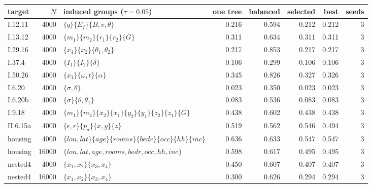 \begin{tabular}{@{}lrlrrrrr@{}}\toprule
target & $N$ & induced groups ($\tau=0.05$) & one tree & balanced & selected & best & seeds\\\midrule
I.12.11 & 4000 & $\{q\} \{E_f\} \{B,v,\theta\}$ & 0.216 & 0.594 & 0.212 & 0.212 & 3\\
I.13.12 & 4000 & $\{m_1\} \{m_2\} \{r_1\} \{r_2\} \{G\}$ & 0.311 & 0.634 & 0.311 & 0.311 & 3\\
I.29.16 & 4000 & $\{x_1\} \{x_2\} \{\theta_1,\theta_2\}$ & 0.217 & 0.853 & 0.217 & 0.217 & 3\\
I.37.4 & 4000 & $\{I_1\} \{I_2\} \{\delta\}$ & 0.106 & 0.299 & 0.106 & 0.106 & 3\\
I.50.26 & 4000 & $\{x_1\} \{\omega,t\} \{\alpha\}$ & 0.345 & 0.826 & 0.327 & 0.326 & 3\\
I.6.20 & 4000 & $\{\sigma,\theta\}$ & 0.023 & 0.350 & 0.023 & 0.023 & 3\\
I.6.20b & 4000 & $\{\sigma\} \{\theta,\theta_1\}$ & 0.083 & 0.536 & 0.083 & 0.083 & 3\\
I.9.18 & 4000 & $\{m_1\} \{m_2\} \{x_2\} \{x_1\} \{y_2\} \{y_1\} \{z_2\} \{z_1\} \{G\}$ & 0.438 & 0.602 & 0.438 & 0.438 & 3\\
II.6.15a & 4000 & $\{\epsilon,r\} \{p_d\} \{x,y\} \{z\}$ & 0.519 & 0.562 & 0.546 & 0.494 & 3\\
housing & 4000 & $\{lon,lat\} \{age\} \{rooms\} \{bedr\} \{occ\} \{hh\} \{inc\}$ & 0.636 & 0.633 & 0.547 & 0.547 & 3\\
housing & 16000 & $\{lon,lat,age,rooms,bedr,occ,hh,inc\}$ & 0.598 & 0.617 & 0.495 & 0.495 & 3\\
nested4 & 4000 & $\{x_1,x_2\} \{x_3,x_4\}$ & 0.450 & 0.607 & 0.407 & 0.407 & 3\\
nested4 & 16000 & $\{x_1,x_2\} \{x_3,x_4\}$ & 0.300 & 0.626 & 0.294 & 0.294 & 3\\
\bottomrule\end{tabular}